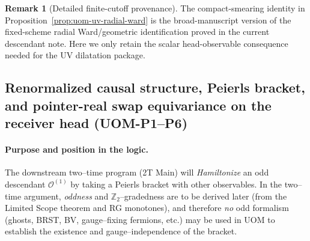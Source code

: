 \documentclass[10pt]{article}
\theoremstyle{definition}
\newtheorem{remark}{Remark}[section]
\theoremstyle{plain}
\begin{document}
\begin{remark}[Detailed finite-cutoff provenance]
\label{rem:uom-uv-radial-ward-provenance}
The compact-smearing identity in
Proposition~\ref{prop:uom-uv-radial-ward} is the broad-manuscript
version of the fixed-scheme radial Ward/geometric identification proved
in the current descendant note.  Here we only retain the scalar
head-observable consequence needed for the UV dilatation package.
\end{remark}


\subsection{Renormalized causal structure, Peierls bracket, and pointer-real swap equivariance on the receiver head (UOM-P1--P6)}
\label{subsec:uom-peierls-package}

\paragraph{Purpose and position in the logic.}
The downstream two--time program (2T Main) will \emph{Hamiltonize} an odd descendant
$\mathcal O^{(1)}$ by taking a Peierls bracket with other observables.  In the two--time
argument, \emph{oddness} and $\mathbb Z_2$--gradedness are to be derived later
(from the Limited Scope theorem and RG monotones), and therefore \emph{no} odd formalism
(ghosts, BRST, BV, gauge--fixing fermions, etc.) may be used in UOM to establish the
existence and gauge--independence of the bracket.
\end{document}
